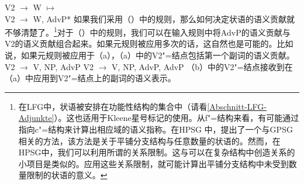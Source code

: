 \ea
\label{adv-metarule}
V2  $\to$ W $\mapsto$\\
V2  $\to$ W, AdvP*
\z 
如果我们采用（）中的规则，那么如何决定状语的语义贡献就不够清楚了。\footnote{%
  在LFG\indexlfgc 中，状语被安排在功能性结构的集合中（请看\ref{Abschnitt-LFG-Adjunkte}）。这也适用于Kleene星号标记的使用。从f"=结构来看，有可能通过指向c"=结构来计算出相应域的语义指称。在HPSG\indexhpsgc
  中，\citet{Kasper94a}提出了一个与GPSG相关的方法，该方法是关于平铺分支结构与任意数量的状语的。然而，在HPSG中，我们可以利用所谓的关系限制。这与可以在复杂结构中创造关系的小项目是类似的。应用这些关系限制，就可能计算出平铺分支结构中未受到数量限制的状语的意义。
}对于（）中的规则，我们可以在输入规则中将AdvP的语义贡献与V2的语义贡献组合起来。如果元规则被应用多次的话，这自然也是可能的。比如说，如果元规则被应用于（a），（a）中的V2"=结点包括第一个副词的语义贡献。
\eal
\ex V2 $\to$ V, NP, AdvP
\ex V2 $\to$ V, NP, AdvP, AdvP
\zl
（b）中的V2"=结点接收到在（a）中应用到V2"=结点上的副词的语义表示。

